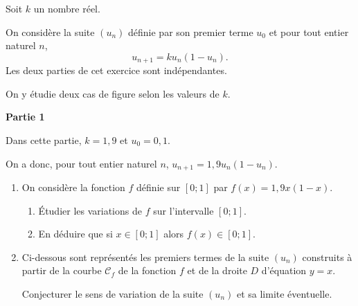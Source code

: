Soit $k$ un nombre réel.

On considère la suite $\left(u_n\right)$ définie par son premier terme $u_0$ et pour tout entier naturel $n$, \[u_{n+1} = ku_n\left(1- u_n\right).\]
%
Les deux parties de cet exercice sont indépendantes. 

On y étudie deux cas de figure selon les valeurs de $k$.

\medskip

\textbf{Partie 1}

\medskip

Dans cette partie, $k = 1,9$ et $u_0 = 0,1$.

On a donc, pour tout entier naturel $n$, $u_{n+1} = 1,9u_n\left(1 - u_n\right)$.

\begin{enumerate}
	\item On considère la fonction $f$ définie sur $[0;1]$ par $f(x) = 1,9x(1 - x)$.
	\begin{enumerate}
		\item Étudier les variations de $f$ sur l'intervalle $[0;1]$.
		\item En déduire que si $x \in [0;1]$ alors $f(x) \in [0;1]$.
	\end{enumerate}
	\item Ci-dessous sont représentés les premiers termes de la suite $\left(u_n\right)$ construits à partir de la courbe $\mathcal{C}_f$ de la fonction $f$ et de la droite $D$ d'équation $y = x$.
	
	Conjecturer le sens de variation de la suite $\left(u_n\right)$ et sa limite éventuelle.
	

\end{enumerate}
